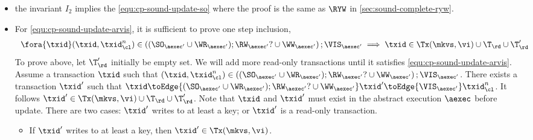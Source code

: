 \begin{itemize}
\item the invariant \( I_2 \) implies the \cref{equ:cp-sound-update-so} where the proof is the same as \( \RYW \) in \cref{sec:sound-complete-ryw}.

\item For \cref{equ:cp-sound-update-arvis}, it is sufficient to prove one step inclusion, \ie
\[
    \begin{array}{l}
    \fora{\txid} (\txid, \txid_\cl^n) \in \left( (\SO_{\aexec'} \cup \WR_{\aexec'} ) ; \RW_{\aexec'}? \cup \WW_{\aexec'} \right) ; \VIS_{\aexec'} 
    \implies \txid \in \Tx(\mkvs, \vi) \cup \T_\rd \cup \T'_\rd 
\end{array}
\]
To prove above, let \( \T'_\rd \) initially be empty set.
We will add more read-only transactions until it satisfies \cref{equ:cp-sound-update-arvis}.
Assume a transaction \( \txid \) such that 
\( (\txid, \txid_\cl^n) \in \left( (\SO_{\aexec'} \cup \WR_{\aexec'} ) ; \RW_{\aexec'}? \cup \WW_{\aexec'} \right) ; \VIS_{\aexec'}\).
There exists a transaction \( \txid' \) such that \( \txid \toEdge{(\SO_{\aexec'} \cup \WR_{\aexec'} ) ; \RW_{\aexec'}? \cup \WW_{\aexec'}} \txid' \toEdge{\VIS_{\aexec'}}  \txid_\cl^n \).
It follows \( \txid'  \in \Tx(\mkvs, \vi) \cup \T_\rd \cup \T'_\rd  \).
Note that \( \txid \) and \( \txid' \) must exist in the abstract execution \( \aexec \) before update.
There are two cases: \( \txid' \) writes to at least a key; or \( \txid' \) is a read-only transaction.
\begin{itemize}
    \item
    If \( \txid' \) writes to at least a key, then \( \txid' \in \Tx(\mkvs, \vi)\).

\end{itemize}
\end{itemize}
